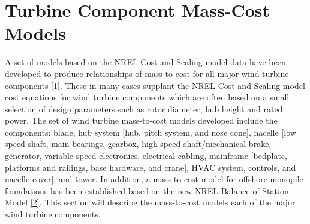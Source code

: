 \documentclass[letterpaper,10pt,openany,oneside]{sphinxmanual}
\begin{document}
\section{Turbine Component Mass-Cost Models}
\label{theory:turbine-component-mass-cost-models}
A set of models based on the NREL Cost and Scaling model data have been developed to produce relationships of mass-to-cost for all major wind turbine components {\hyperref[theory:1]{{[}1{]}}}.  These in many cases supplant the NREL Cost and Scaling model cost equations for wind turbine components which are often based on a small selection of design parameters such as rotor diameter, hub height and rated power.  The set of wind turbine mass-to-cost models developed include the components: blade, hub system {[}hub, pitch system, and nose cone{]}, nacelle {[}low speed shaft, main bearings, gearbox, high speed shaft/mechanical brake, generator, variable speed electronics, electrical cabling, mainframe {[}bedplate, platforms and railings, base hardware, and crane{]}, HVAC system, controls, and nacelle cover{]}, and tower.  In addition, a mass-to-cost model for offshore monopile foundations has been established based on the new NREL Balance of Station Model {\hyperref[theory:2]{{[}2{]}}}.  This section will describe the mass-to-cost models each of the major wind turbine components.
\end{document}
